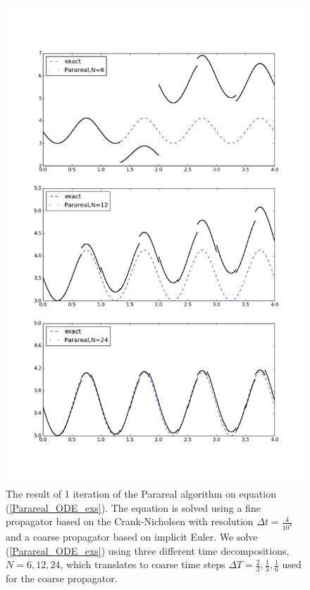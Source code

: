 \begin{figure}[h]
\centering
\includegraphics[scale=0.5]{parareal_img.png}
\caption{The result of 1 iteration of the Parareal algorithm on equation (\ref{Parareal_ODE_exs}). The equation is solved using a fine propagator based on the Crank-Nicholsen with resolution $\Delta t=\frac{4}{10^4}$ and a coarse propagator based on implicit Euler. We solve (\ref{Parareal_ODE_exs}) using three different time decompositions, $N=6,12,24$, which translates to coarse time steps $\Delta T=\frac{2}{3},\frac{1}{3},\frac{1}{6}$ used for the coarse propagator. }
\label{P_fig_1_itr}
\end{figure}
